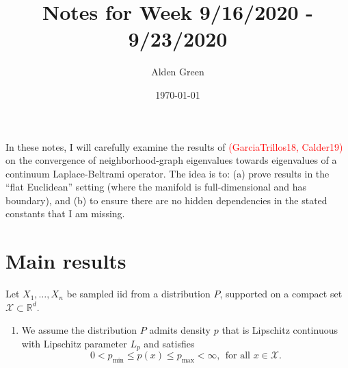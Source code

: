 \documentclass{article}
\newcommand{\Reals}{\mathbb{R}}
\newcommand{\1}{\mathbf{1}}
\newcommand{\Xset}{\mathcal{X}}
\theoremstyle{alden}
\theoremstyle{aldenthm}
\theoremstyle{definition}
\theoremstyle{remark}
\begin{document}
\title{Notes for Week 9/16/2020 - 9/23/2020}
\author{Alden Green}
\date{\today}
\maketitle

In these notes, I will carefully examine the results of \textcolor{red}{(GarciaTrillos18, Calder19)} on the convergence of neighborhood-graph eigenvalues towards eigenvalues of a continuum Laplace-Beltrami operator. The idea is to: (a) prove results in the ``flat Euclidean'' setting (where the manifold is full-dimensional and has boundary), and (b) to ensure there are no hidden dependencies in the stated constants that I am missing.

\section{Main results}
Let $X_1,\ldots,X_n$ be sampled iid from a distribution $P$, supported on a compact set $\Xset \subset \Reals^d$. 

\begin{enumerate}[(P1)]
	\item 
	\label{asmp:bounded_lipschitz_density} We assume the distribution $P$ admits density $p$ that is Lipschitz continuous with Lipschitz parameter $L_p$ and satisfies
	\begin{equation*}
	0 < p_{\min} \leq p(x) \leq p_{\max} < \infty,~~\textrm{for all $x \in \Xset$.}
	\end{equation*}
\end{enumerate}
\end{document}
